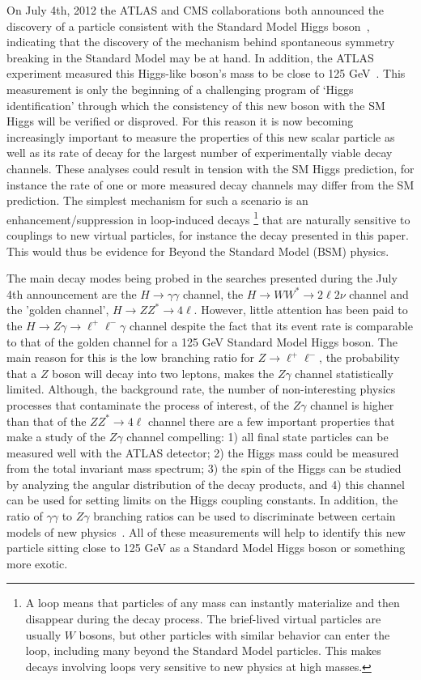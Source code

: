 On July 4th, 2012 the ATLAS and CMS collaborations both announced the 
discovery of a particle consistent with the 
Standard Model Higgs boson~\cite{ATLAS_Higgs,CMS_Higgs}, indicating that
the discovery of the mechanism behind spontaneous symmetry breaking in the
Standard Model may be at hand. In addition, the ATLAS experiment measured 
this Higgs-like boson's mass to be close to 125 GeV~\cite{ATLAS_Higgs_Dec12}.
This measurement is only the beginning of a challenging program of `Higgs
identification' through which the consistency of this new boson with the SM
Higgs will be verified or disproved. For this reason it is now becoming
increasingly important to measure the properties of this new scalar particle
as well as its rate of decay for the largest number of experimentally
viable decay channels. These analyses could result in tension with the SM
Higgs prediction, for instance the rate of one or more measured decay channels
may differ from the SM prediction. The simplest mechanism for such a scenario
is an enhancement/suppression in loop-induced decays
\footnote{A loop means that particles of any mass can instantly materialize and 
then disappear during the decay process. The brief-lived virtual particles
are usually $W$ bosons, but other particles with similar behavior can enter
the loop, including many beyond the Standard Model particles. This makes decays 
involving loops very sensitive to new physics at high masses.}
that are naturally sensitive to couplings to new virtual particles, 
for instance the decay \HToZg presented in this paper. 
This would thus be evidence for Beyond the Standard Model (BSM) physics.

The main decay modes being probed in the searches
presented during the July 4th announcement are the $H \to \gamma\gamma$ channel,
the $H \to WW^* \to 2\ell2\nu$ channel and the 'golden channel',
$H \to ZZ^* \to 4\ell$. However, little attention has been paid to the 
$H \to Z\gamma \to \ell^+\ell^-\gamma$ channel
despite the fact that its event rate is comparable to that of the golden channel 
for a 125 GeV Standard Model Higgs boson. The main reason for this is 
the low branching ratio for $Z \to \ell^+\ell^-$, the
probability that a $Z$ boson will decay into two leptons, 
makes the $Z\gamma$ channel statistically limited. 
Although, the background rate, the number of non-interesting physics processes
that contaminate the process of interest, of the $Z\gamma$ channel is higher than
that of the $ZZ^* \rightarrow 4\ell$ channel
there are a few important properties that make a study of the $Z\gamma$ channel 
compelling: 
1) all final state particles can be measured well with the ATLAS detector;  
2) the Higgs mass could be measured from the total invariant mass spectrum; 
3) the spin of the Higgs can be studied by analyzing the angular distribution 
of the decay products, and 
4) this channel can be used for setting limits on the Higgs coupling constants.
In addition, the ratio of $\gamma\gamma$ to $Z\gamma$ branching ratios can
be used to discriminate between certain models of 
new physics~\cite{Zg_newPhy_1,Zg_newPhy_2, Zg_newPhy_3}.
All of these measurements will help to identify this new particle sitting
close to 125 GeV as a Standard Model Higgs boson or something more exotic.


